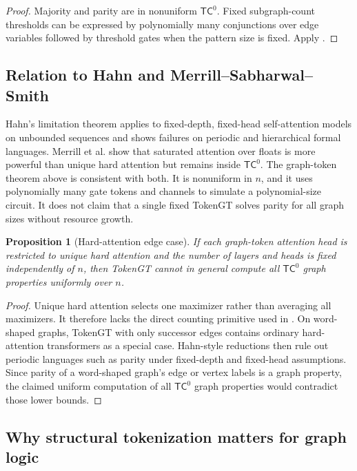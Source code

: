 \documentclass[11pt]{article}
\newtheorem{proposition}[theorem]{Proposition}
\begin{document}
\begin{proof}
Majority and parity are in nonuniform $\mathsf{TC}^0$.  Fixed subgraph-count thresholds can be expressed by polynomially many conjunctions over edge variables followed by threshold gates when the pattern size is fixed.  Apply .
\end{proof}

\subsection{Relation to Hahn and Merrill--Sabharwal--Smith}

Hahn's limitation theorem \cite{hahn2020limitations} applies to fixed-depth, fixed-head self-attention models on unbounded sequences and shows failures on periodic and hierarchical formal languages.  Merrill et al. \cite{merrill2022saturated} show that saturated attention over floats is more powerful than unique hard attention but remains inside $\mathsf{TC}^0$.  The graph-token theorem above is consistent with both.  It is nonuniform in $n$, and it uses polynomially many gate tokens and channels to simulate a polynomial-size circuit.  It does not claim that a single fixed TokenGT solves parity for all graph sizes without resource growth.

\begin{proposition}[Hard-attention edge case]
\label{prop:hard-edge}
If each graph-token attention head is restricted to unique hard attention and the number of layers and heads is fixed independently of $n$, then TokenGT cannot in general compute all $\mathsf{TC}^0$ graph properties uniformly over $n$.
\end{proposition}

\begin{proof}
Unique hard attention selects one maximizer rather than averaging all maximizers.  It therefore lacks the direct counting primitive used in .  On word-shaped graphs, TokenGT with only successor edges contains ordinary hard-attention transformers as a special case.  Hahn-style reductions then rule out periodic languages such as parity under fixed-depth and fixed-head assumptions.  Since parity of a word-shaped graph's edge or vertex labels is a graph property, the claimed uniform computation of all $\mathsf{TC}^0$ graph properties would contradict those lower bounds.
\end{proof}

\subsection{Why structural tokenization matters for graph logic}
\end{document}
